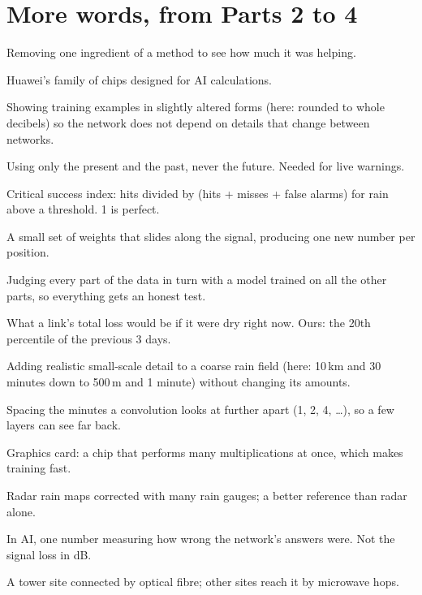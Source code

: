 \section{More words, from Parts 2 to 4}
\small
\begin{description}[leftmargin=3.2cm,style=nextline,itemsep=0.25em]
\item[Ablation] Removing one ingredient of a method to see how much it was helping.
\item[Ascend] Huawei's family of chips designed for AI calculations.
\item[Augmentation] Showing training examples in slightly altered forms (here: rounded to whole decibels) so the network does not depend on details that change between networks.
\item[Causal] Using only the present and the past, never the future. Needed for live warnings.
\item[CSI] Critical success index: hits divided by (hits + misses + false alarms) for rain above a threshold. 1 is perfect.
\item[Convolution] A small set of weights that slides along the signal, producing one new number per position.
\item[Cross-validation] Judging every part of the data in turn with a model trained on all the other parts, so everything gets an honest test.
\item[Dry level] What a link's total loss would be if it were dry right now. Ours: the 20th percentile of the previous 3 days.
\item[Downscaling] Adding realistic small-scale detail to a coarse rain field (here: 10\,km and 30 minutes down to 500\,m and 1 minute) without changing its amounts.
\item[Dilation] Spacing the minutes a convolution looks at further apart (1, 2, 4, \ldots), so a few layers can see far back.
\item[GPU] Graphics card: a chip that performs many multiplications at once, which makes training fast.
\item[Gauge-adjusted radar] Radar rain maps corrected with many rain gauges; a better reference than radar alone.
\item[Loss (penalty)] In AI, one number measuring how wrong the network's answers were. Not the signal loss in dB.
\item[Hub (fibre)] A tower site connected by optical fibre; other sites reach it by microwave hops.

\end{description}
